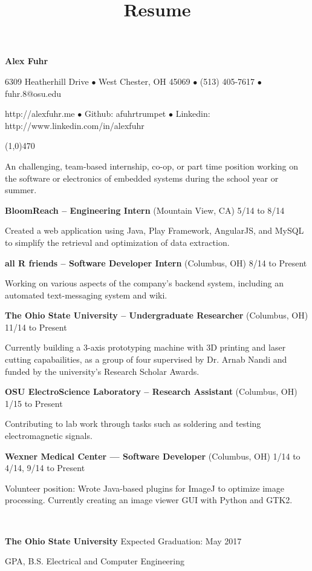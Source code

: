 \documentclass[10pt]{article}
\title{Resume}
\begin{document}
\centerline{{\LARGE \bf Alex Fuhr}}
\centerline{6309 Heatherhill Drive $\bullet$ West Chester, OH 45069 $\bullet$ (513) 405-7617 $\bullet$ fuhr.8@osu.edu}
\centerline{http://alexfuhr.me $\bullet$ Github: afuhrtrumpet $\bullet$ Linkedin: http://www.linkedin.com/in/alexfuhr}
\noindent
\line(1,0){470}\\

\smallskip

\noindent
An challenging, team-based internship, co-op, or part time position working on the software or electronics of embedded systems during the school year or summer.
\medskip

\smallskip

\centerline{{\large {\bf BloomReach -- Engineering Intern} (Mountain View, CA) \hfill 5/14 to 8/14}}
\noindent
Created a web application using Java, Play Framework, AngularJS, and MySQL to simplify the retrieval and optimization of data extraction.

\smallskip
\centerline{{\large {\bf all R friends -- Software Developer Intern} (Columbus, OH) \hfill 8/14 to Present}}
\noindent
Working on various aspects of the company's backend system, including an automated text-messaging system and wiki.
\smallskip

\centerline{{\large {\bf The Ohio State University -- Undergraduate Researcher} (Columbus, OH) \hfill 11/14 to Present}}
\noindent
Currently building a 3-axis prototyping machine with 3D printing and laser cutting capabailities, as a group of four supervised by Dr. Arnab Nandi and funded by the university's Research Scholar Awards.
\smallskip

\centerline{{\large {\bf OSU ElectroScience Laboratory -- Research Assistant} (Columbus, OH) \hfill 1/15 to Present}}
\noindent
Contributing to lab work through tasks such as soldering and testing electromagnetic signals.
\smallskip

\centerline{{\large {\bf Wexner Medical Center --- Software Developer} (Columbus, OH) \hfill 1/14 to 4/14, 9/14 to Present}}
\noindent
Volunteer position: Wrote Java-based plugins for ImageJ to optimize image processing. Currently creating an image viewer GUI with Python and GTK2.
\medskip

\\
\smallskip
\centerline{{\large {\bf The Ohio State University} \hfill Expected Graduation: May 2017}}
 GPA, B.S. Electrical and Computer Engineering
\medskip
\end{document}
